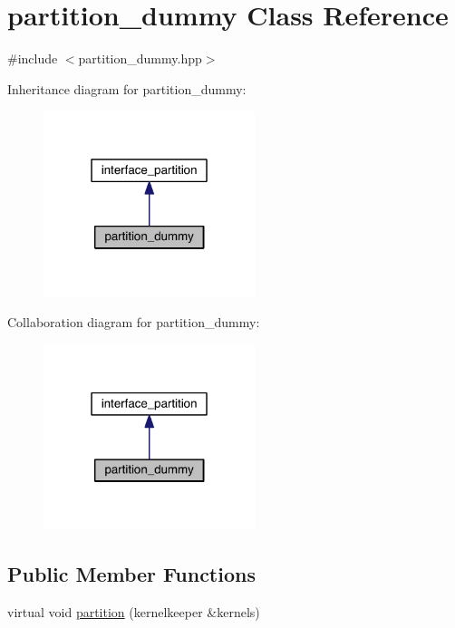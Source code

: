 \hypertarget{classpartition__dummy}{}\section{partition\+\_\+dummy Class Reference}
\label{classpartition__dummy}


{\ttfamily \#include $<$partition\+\_\+dummy.\+hpp$>$}



Inheritance diagram for partition\+\_\+dummy\+:
\nopagebreak
\begin{figure}[H]
\begin{center}
\leavevmode
\includegraphics[width=175pt]{classpartition__dummy__inherit__graph}
\end{center}
\end{figure}


Collaboration diagram for partition\+\_\+dummy\+:
\nopagebreak
\begin{figure}[H]
\begin{center}
\leavevmode
\includegraphics[width=175pt]{classpartition__dummy__coll__graph}
\end{center}
\end{figure}
\subsection*{Public Member Functions}
\begin{DoxyCompactItemize}
\item 
virtual void \hyperlink{classpartition__dummy_ae40e5fa9d982e718f399fe3244435e7a}{partition} (kernelkeeper \&kernels)
\end{DoxyCompactItemize}
